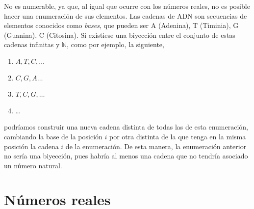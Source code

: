 \documentclass[
  a4paper,
]{scrreport}
\providecommand{\tightlist}{%
  \setlength{\itemsep}{0pt}\setlength{\parskip}{0pt}}\usepackage{longtable,booktabs,array}
\theoremstyle{definition}
\theoremstyle{remark}
\begin{document}
\begin{tcolorbox}
\begin{tcolorbox}
\begin{tcolorbox}
\begin{tcolorbox}
\begin{tcolorbox}
\begin{tcolorbox}
\begin{tcolorbox}
\begin{tcolorbox}
\begin{tcolorbox}
\begin{tcolorbox}
\begin{tcolorbox}
\begin{tcolorbox}
\begin{tcolorbox}
\begin{tcolorbox}
\begin{tcolorbox}
\begin{tcolorbox}
\begin{tcolorbox}
\begin{tcolorbox}
\begin{tcolorbox}
\begin{tcolorbox}
\begin{tcolorbox}
\begin{tcolorbox}
\begin{tcolorbox}
\begin{tcolorbox}
\begin{tcolorbox}
\begin{tcolorbox}
\begin{tcolorbox}
\begin{tcolorbox}
\begin{tcolorbox}
\begin{tcolorbox}
\begin{tcolorbox}
\begin{tcolorbox}
\begin{tcolorbox}
\begin{tcolorbox}
\begin{tcolorbox}
\begin{tcolorbox}
\begin{tcolorbox}
\begin{tcolorbox}
\begin{tcolorbox}
\begin{tcolorbox}
\begin{tcolorbox}
\begin{tcolorbox}
\begin{tcolorbox}
\begin{tcolorbox}
\begin{tcolorbox}
\begin{tcolorbox}
\begin{tcolorbox}
\begin{tcolorbox}
\begin{tcolorbox}
No es numerable, ya que, al igual que ocurre con los números reales, no
es posible hacer una enumeración de sus elementos. Las cadenas de ADN
son secuencias de elementos conocidos como \emph{bases}, que pueden ser
A (Adenina), T (Timinia), G (Guanina), C (Citosina). Si existiese una
biyección entre el conjunto de estas cadenas infinitas y \(\mathbb{N}\),
como por ejemplo, la siguiente,

\begin{enumerate}
\def\labelenumi{\arabic{enumi}.}
\tightlist
\item
  \(A,T,C,\ldots\)
\item
  \(C,G,A\ldots\)
\item
  \(T,C,G,\ldots\)
\item
  \ldots
\end{enumerate}

podríamos construir una nueva cadena distinta de todas las de esta
enumeración, cambiando la base de la posición \(i\) por otra distinta de
la que tenga en la misma posición la cadena \(i\) de la enumeración. De
esta manera, la enumeración anterior no sería una biyección, pues habría
al menos una cadena que no tendría asociado un número natural.

\end{tcolorbox}


\hypertarget{nuxfameros-reales}{%
\chapter{Números reales}\label{nuxfameros-reales}}


\end{tcolorbox}
\end{tcolorbox}
\end{tcolorbox}
\end{tcolorbox}
\end{tcolorbox}
\end{tcolorbox}
\end{tcolorbox}
\end{tcolorbox}
\end{tcolorbox}
\end{tcolorbox}
\end{tcolorbox}
\end{tcolorbox}
\end{tcolorbox}
\end{tcolorbox}
\end{tcolorbox}
\end{tcolorbox}
\end{tcolorbox}
\end{tcolorbox}
\end{tcolorbox}
\end{tcolorbox}
\end{tcolorbox}
\end{tcolorbox}
\end{tcolorbox}
\end{tcolorbox}
\end{tcolorbox}
\end{tcolorbox}
\end{tcolorbox}
\end{tcolorbox}
\end{tcolorbox}
\end{tcolorbox}
\end{tcolorbox}
\end{tcolorbox}
\end{tcolorbox}
\end{tcolorbox}
\end{tcolorbox}
\end{tcolorbox}
\end{tcolorbox}
\end{tcolorbox}
\end{tcolorbox}
\end{tcolorbox}
\end{tcolorbox}
\end{tcolorbox}
\end{tcolorbox}
\end{tcolorbox}
\end{tcolorbox}
\end{tcolorbox}
\end{tcolorbox}
\end{tcolorbox}
\end{document}
